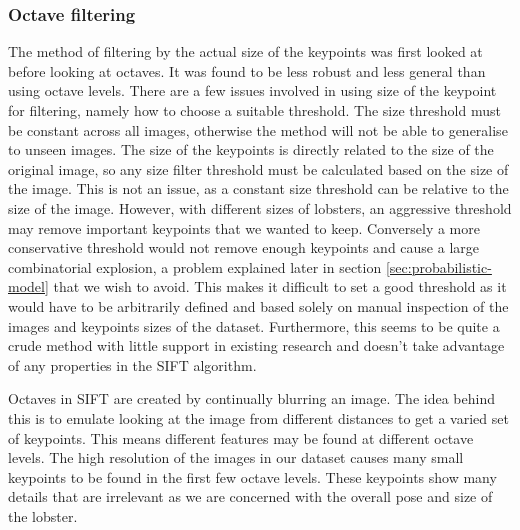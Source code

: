 \subsubsection{Octave filtering}
The method of filtering by the actual size of the keypoints was first looked at before looking at octaves. It was found to be less robust and less general than using octave levels. There are a few issues involved in using size of the keypoint for filtering, namely how to choose a suitable threshold. The size threshold must be constant across all images, otherwise the method will not be able to generalise to unseen images. The size of the keypoints is directly related to the size of the original image, so any size filter threshold must be calculated based on the size of the image. This is not an issue, as a constant size threshold can be relative to the size of the image. However, with different sizes of lobsters, an aggressive threshold may remove important keypoints that we wanted to keep. Conversely a more conservative threshold would not remove enough keypoints and cause a large combinatorial explosion, a problem explained later in section \ref{sec:probabilistic-model} that we wish to avoid. This makes it difficult to set a good threshold as it would have to be arbitrarily defined and based solely on manual inspection of the images and keypoints sizes of the dataset. Furthermore, this seems to be quite a crude method with little support in existing research and doesn't take advantage of any properties in the SIFT algorithm. 

Octaves in SIFT are created by continually blurring an image. The idea behind this is to emulate looking at the image from different distances to get a varied set of keypoints. This means different features may be found at different octave levels. The high resolution of the images in our dataset causes many small keypoints to be found in the first few octave levels. These keypoints show many details that are irrelevant as we are concerned with the overall pose and size of the lobster.

